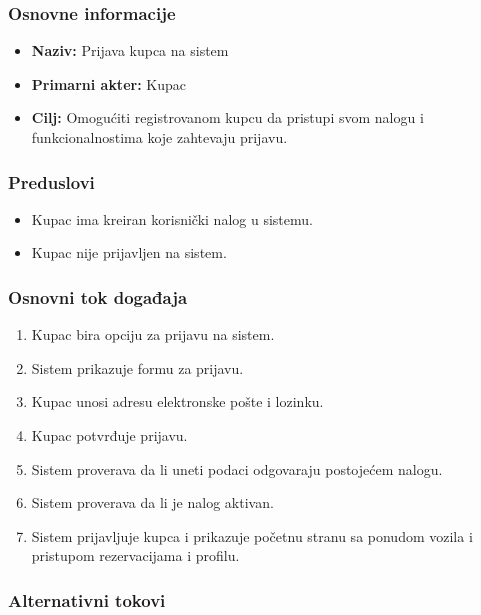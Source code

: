 \documentclass[a4paper,12pt]{article}
\begin{document}
\subsubsection{Osnovne informacije}

\begin{itemize}
    \item \textbf{Naziv:} Prijava kupca na sistem
    \item \textbf{Primarni akter:} Kupac
    \item \textbf{Cilj:} Omogućiti registrovanom kupcu da pristupi svom nalogu i funkcionalnostima koje zahtevaju prijavu.
\end{itemize}

\subsubsection{Preduslovi}

\begin{itemize}
    \item Kupac ima kreiran korisnički nalog u sistemu.
    \item Kupac nije prijavljen na sistem.
\end{itemize}

\subsubsection{Osnovni tok događaja}

\begin{enumerate}
    \item Kupac bira opciju za prijavu na sistem.
    \item Sistem prikazuje formu za prijavu.
    \item Kupac unosi adresu elektronske pošte i lozinku.
    \item Kupac potvrđuje prijavu.
    \item Sistem proverava da li uneti podaci odgovaraju postojećem nalogu.
    \item Sistem proverava da li je nalog aktivan.
    \item Sistem prijavljuje kupca i prikazuje početnu stranu sa ponudom vozila i pristupom rezervacijama i profilu.
\end{enumerate}

\subsubsection{Alternativni tokovi}
\end{document}

